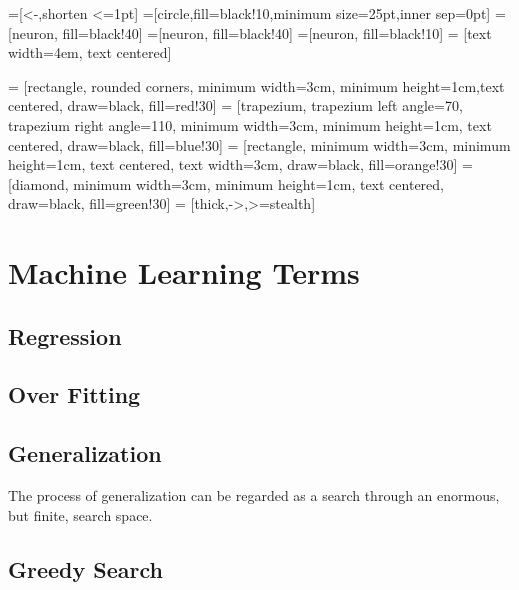 \documentclass[12pt, right open]{memoir}
\begin{document}



=[<-,shorten <=1pt]
=[circle,fill=black!10,minimum size=25pt,inner sep=0pt]
=[neuron, fill=black!40]
=[neuron, fill=black!40]
=[neuron, fill=black!10]
 = [text width=4em, text centered]

 = [rectangle, rounded corners, minimum width=3cm, minimum height=1cm,text centered, draw=black, fill=red!30]
 = [trapezium, trapezium left angle=70, trapezium right angle=110, minimum width=3cm, minimum height=1cm, text centered, draw=black, fill=blue!30]
 = [rectangle, minimum width=3cm, minimum height=1cm, text centered, text width=3cm, draw=black, fill=orange!30]
 = [diamond, minimum width=3cm, minimum height=1cm, text centered, draw=black, fill=green!30]
 = [thick,->,>=stealth]

\tableofcontents

\chapter{Machine Learning Terms}

\section{Regression}
\section{Over Fitting}
\section{Generalization}
The process of generalization can be regarded as a search through an enormous, but
finite, search space.
\section{Greedy Search}
\end{document}
